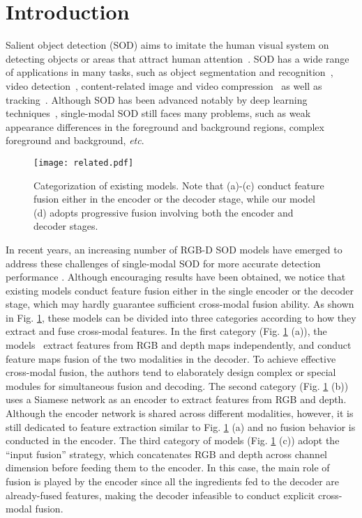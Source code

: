 \documentclass[letterpaper]{article}
\def\etc{\emph{etc}}
\begin{document}
\section{Introduction}
Salient object detection (SOD) aims to imitate the human visual system on detecting objects or areas that attract human attention~\cite{jiang2020light,fan2018salient,zhao2019egnet}. SOD has a wide range of applications in many tasks, such as object segmentation and recognition~\cite{han2005unsupervised,li2011saliency}, video detection~\cite{li2019motion,fan2019shifting}, content-related image and video compression~\cite{itti2004automatic,guo2009novel} as well as tracking~\cite{zhang2020non}. Although SOD has been advanced notably by deep learning techniques~\cite{wang2019salient}, single-modal SOD still faces many problems, such as weak appearance differences in the foreground and background regions, complex foreground and background, \etc.

\begin{figure}
	\centering
	\texttt{[image: related.pdf]}\vspace{-0.3cm}
	\caption{\small Categorization of existing models. Note that (a)-(c) conduct feature fusion either in the encoder or the decoder stage, while our model (d) adopts progressive fusion involving both the encoder and decoder stages.}\vspace{-0.8cm}
	\label{related}
\end{figure}

In recent years, an increasing number of RGB-D SOD models have emerged to address these challenges of single-modal SOD for more accurate detection performance \cite{zhang2020bilateral}. Although encouraging results have been obtained, we notice that existing models conduct feature fusion either in the single encoder or the decoder stage, which may hardly guarantee sufficient cross-modal fusion ability. As shown in Fig. \ref{related}, these models can be divided into three categories according to how they extract and fuse cross-modal features.
In the first category (Fig. \ref{related} (a)), the models~\cite{fan2020bbs,pang2020hierarchical,liu2020learning,piao2020a2dele,zhang2020select} extract features from RGB and depth maps independently, and conduct feature maps fusion of the two modalities in the decoder. To achieve effective cross-modal fusion, the authors tend to elaborately design complex or special modules for simultaneous fusion and decoding.
The second category \cite{fu2020jl,li2020icnet} (Fig. \ref{related} (b)) uses a Siamese network as an encoder to extract features from RGB and depth. Although the encoder network is shared across different modalities, however, it is still dedicated to feature extraction similar to Fig. \ref{related} (a) and no fusion behavior is conducted in the encoder.
The third category of models \cite{zhao2020single,fan2020rethinking,song2017depth,liu2019salient} (Fig. \ref{related} (c)) adopt the ``input fusion'' strategy, which concatenates RGB and depth across channel dimension before feeding them to the encoder. In this case, the main role of fusion is played by the encoder since all the ingredients fed to the decoder are already-fused features, making the decoder infeasible to conduct explicit cross-modal fusion.
\end{document}
